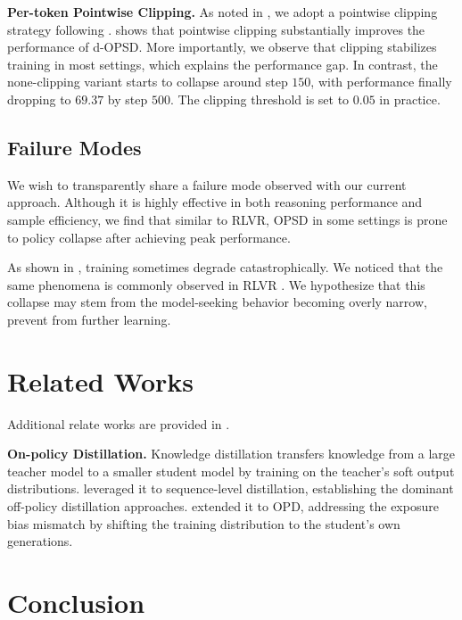 \documentclass{article}
\begin{document}
\textbf{Per-token Pointwise Clipping. } As noted in , we adopt a pointwise clipping strategy following \citep{zhao2026self}.  shows that pointwise clipping substantially improves the performance of d-OPSD. More importantly, we observe that clipping stabilizes training in most settings, which explains the performance gap. In contrast, the none-clipping variant starts to collapse around step $150$, with performance finally dropping to $69.37$ by step $500$. The clipping threshold is set to $0.05$ in practice.



\subsection{Failure Modes} \label{sec4.5}

We wish to transparently share a failure mode observed with our current approach. Although it is highly effective in both reasoning performance and sample efficiency, we find that similar to RLVR, OPSD in some settings is prone to policy collapse after achieving peak performance. 

As shown in , training sometimes degrade catastrophically. We noticed that the same phenomena is commonly observed in RLVR \citep{deng2025grpo, bai2025m}. We hypothesize that this collapse may stem from the model-seeking behavior \citep{agarwal2024policy} becoming overly narrow, prevent from further learning.

\section{Related Works}


Additional relate works are provided in .

\textbf{On-policy Distillation. } Knowledge distillation \citep{hinton2015distilling} transfers knowledge from a large teacher model to a smaller student model by training on the teacher's soft output distributions. \citet{kim2016sequence, jiao2020tinybert, wang2020minilm} leveraged it to sequence-level distillation, establishing the dominant off-policy distillation approaches. \citep{gu2024minillm, agarwal2024policy, lu2025onpolicydistillation, yang2026learning} extended it to OPD, addressing the exposure bias \citep{bengio2015scheduled} mismatch by shifting the training distribution to the student's own generations.


\section{Conclusion}
\end{document}
